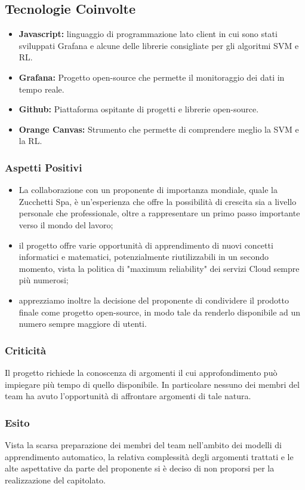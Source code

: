 	\subsection{Tecnologie Coinvolte}
	\begin{itemize}
		\item \textbf{Javascript:} linguaggio di programmazione lato client in cui sono stati sviluppati Grafana e alcune delle librerie consigliate per gli algoritmi SVM e RL.
		\item \textbf{Grafana:} Progetto open-source che permette il monitoraggio dei dati in tempo reale.
		\item \textbf{Github:} Piattaforma ospitante di progetti e librerie open-source.
		\item \textbf{Orange Canvas:} Strumento che permette di comprendere meglio la SVM e la RL.
	\end{itemize}
	
	\subsubsection{Aspetti Positivi}
	\begin{itemize}
		\item La collaborazione con un proponente di importanza mondiale, quale la Zucchetti Spa, è un'esperienza che offre la possibilità di crescita sia a livello personale che professionale, oltre a rappresentare un primo passo importante verso il mondo del lavoro; 
		\item il progetto offre varie opportunità di apprendimento di nuovi concetti informatici e matematici, potenzialmente riutilizzabili in un secondo momento, vista la politica di "maximum reliability" dei servizi Cloud sempre più numerosi; 
		\item apprezziamo inoltre la decisione del proponente di condividere il prodotto finale come progetto open-source, in modo tale da renderlo disponibile ad un numero sempre maggiore di utenti.
	\end{itemize}

	\subsubsection{Criticità}
		Il progetto richiede la conoscenza di argomenti il cui approfondimento può impiegare più tempo di quello disponibile. In particolare nessuno dei membri del team ha avuto l'opportunità di affrontare argomenti di tale natura.
	
	\subsubsection{Esito}
		Vista la scarsa preparazione dei membri del team nell'ambito dei modelli di apprendimento automatico, la relativa complessità degli argomenti trattati e le alte aspettative da parte del proponente si è deciso di non proporsi per la realizzazione del capitolato.